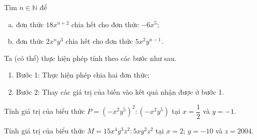 \begin{vd}
	Tìm $n\in\mathbb{N}$ để
	\begin{enumerate}[a)]
		\item đơn thức $18x^{n+2}$ chia hết cho đơn thức $-6x^5$;
		\item đơn thức $2x^ny^3$ chia hết cho đơn thức $5x^2y^{n-1}$.
	\end{enumerate}
\end{vd}


\begin{dang}
	Ta (có thể) thực hiện phép tính theo các bước như sau.
	\begin{enumerate}[\tickEX]
		\item Bước 1: Thực hiện phép chia hai đơn thức;
		\item Bước 2: Thay các giá trị của biến vào kết quả nhận được ở bước 1.
	\end{enumerate}
\end{dang}
\begin{vd}
	Tính giá trị của biểu thức $P=(-x^2y^5)^2:(-x^2y^5)$ tại $x=\dfrac{1}{2}$ và $y=-1$.
\end{vd}
\begin{vd}
	Tính giá trị của biểu thức $M=15x^4y^3z^2:5xy^2z^2$ tại $x=2$; $y=-10$ và $z=2004$.
\end{vd}



